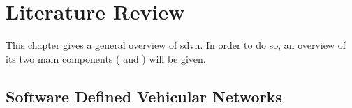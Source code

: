 \chapter{Literature Review}
\label{cha:literature}


This chapter gives a general overview of \gls{sdvn}. In order to do so, an overview of its two main components ( and ) will be given.






\section{Software Defined Vehicular Networks} %









